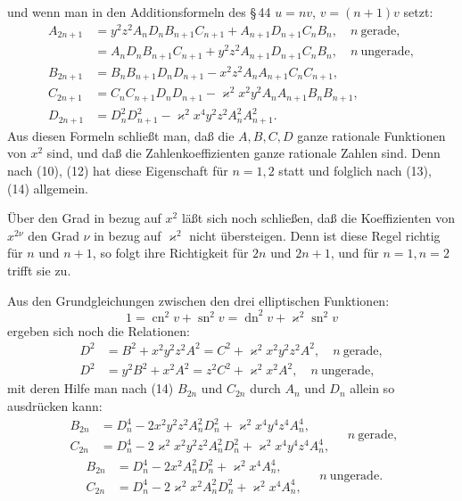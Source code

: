 \documentclass[11pt]{article}
\providecommand{\sn}{\operatorname{sn}}
\providecommand{\cn}{\operatorname{cn}}
\providecommand{\dn}{\operatorname{dn}}
\begin{document}
und wenn man in den Additionsformeln des \S\,44 $u=nv$, $v=(n+1)v$ setzt:
\begin{equation}
\begin{aligned}
A_{2n+1}&=y^2z^2A_nD_nB_{n+1}C_{n+1}+A_{n+1}D_{n+1}C_nB_n,\quad n\ \text{gerade},\\
&=A_nD_nB_{n+1}C_{n+1}+y^2z^2A_{n+1}D_{n+1}C_nB_n,\quad n\ \text{ungerade},\\
B_{2n+1}&=B_nB_{n+1}D_nD_{n+1}-x^2z^2A_nA_{n+1}C_nC_{n+1},\\
C_{2n+1}&=C_nC_{n+1}D_nD_{n+1}-\varkappa^2x^2y^2A_nA_{n+1}B_nB_{n+1},\\
D_{2n+1}&=D_n^2D_{n+1}^2-\varkappa^2x^4y^2z^2A_n^2A_{n+1}^2.
\end{aligned}
\tag{14}
\end{equation}
Aus diesen Formeln schließt man, daß die $A,B,C,D$ ganze rationale Funktionen von $x^2$
sind, und daß die Zahlenkoeffizienten ganze rationale Zahlen sind. Denn nach (10), (12)
hat diese Eigenschaft für $n=1,2$ statt und folglich nach (13), (14) allgemein.

Über den Grad in bezug auf $x^2$ läßt sich noch schließen, daß die Koeffizienten von $x^{2\nu}$
den Grad $\nu$ in bezug auf $\varkappa^2$ nicht übersteigen. Denn ist diese Regel richtig
für $n$ und $n+1$, so folgt ihre Richtigkeit für $2n$ und $2n+1$, und für $n=1,n=2$
trifft sie zu.

Aus den Grundgleichungen zwischen den drei elliptischen Funktionen:
\[
1=\cn^2v+\sn^2v=\dn^2v+\varkappa^2\sn^2v
\]
ergeben sich noch die Relationen:
\begin{equation}
\begin{aligned}
D^2&=B^2+x^2y^2z^2A^2=C^2+\varkappa^2x^2y^2z^2A^2,\quad n\ \text{gerade},\\
D^2&=y^2B^2+x^2A^2=z^2C^2+\varkappa^2x^2A^2,\quad n\ \text{ungerade},
\end{aligned}
\tag{15}
\end{equation}
mit deren Hilfe man nach (14) $B_{2n}$ und $C_{2n}$ durch $A_n$ und $D_n$ allein so
ausdrücken kann:
\begin{equation}
\begin{aligned}
B_{2n}&=D_n^4-2x^2y^2z^2A_n^2D_n^2+\varkappa^2x^4y^4z^4A_n^4,\\
C_{2n}&=D_n^4-2\varkappa^2x^2y^2z^2A_n^2D_n^2+\varkappa^2x^4y^4z^4A_n^4,
\end{aligned}\quad n\ \text{gerade},
\tag{16a}
\end{equation}
\[
\begin{aligned}
B_{2n}&=D_n^4-2x^2A_n^2D_n^2+\varkappa^2x^4A_n^4,\\
C_{2n}&=D_n^4-2\varkappa^2x^2A_n^2D_n^2+\varkappa^2x^4A_n^4,
\end{aligned}\quad n\ \text{ungerade}.
\tag{16b}
\]
\end{document}
